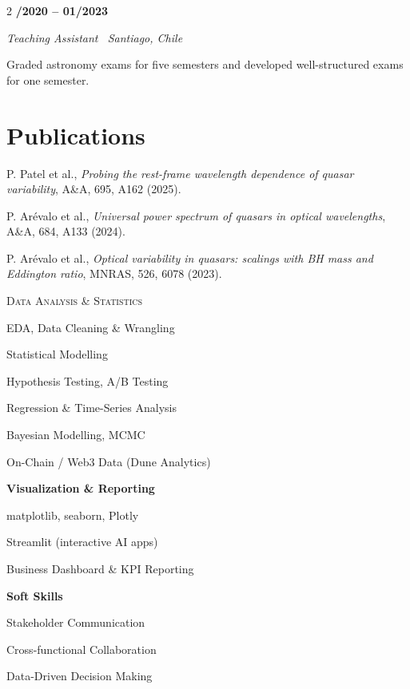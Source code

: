 \documentclass[9pt]{extarticle}
\newcommand{\skillhead}[1]{{\scshape\color{accent}\fontsize{8.4}{10}\selectfont #1}\par\vspace{2pt}}
\newcommand{\skillsub}[1]{{\bfseries\fontsize{8.2}{9.8}\selectfont #1}\par\vspace{2pt}}
\newcommand{\jobtitle}[2]{%
  \noindent{\bfseries\fontsize{9.3}{11}\selectfont #1}\hfill{\bfseries\fontsize{8.6}{10.4}\selectfont #2}\par}
\newcommand{\jobrole}[1]{{\itshape\fontsize{8.6}{10.4}\selectfont #1}\par\vspace{0.5pt}}
\begin{document}
\begin{paracol}{2}
\jobtitle{UNIVERSIDAD DE CHILE}{03/2020 -- 01/2023}
\jobrole{Teaching Assistant \textperiodcentered\ Santiago, Chile}
\begin{bullets}
  \item Graded astronomy exams for five semesters and developed well-structured exams for one semester.
\end{bullets}

\section*{Publications}
P. Patel et al., \textit{Probing the rest-frame wavelength dependence of quasar variability}, A\&A, 695, A162 (2025).\par\vspace{3pt}
P. Ar\'evalo et al., \textit{Universal power spectrum of quasars in optical wavelengths}, A\&A, 684, A133 (2024).\par\vspace{3pt}
P. Ar\'evalo et al., \textit{Optical variability in quasars: scalings with BH mass and Eddington ratio}, MNRAS, 526, 6078 (2023).\par

\switchcolumn

\skillhead{Data Analysis \& Statistics}
\begin{skills}
  \item EDA, Data Cleaning \& Wrangling
  \item Statistical Modelling
  \item Hypothesis Testing, A/B Testing
  \item Regression \& Time-Series Analysis
  \item Bayesian Modelling, MCMC
  \item On-Chain / Web3 Data (Dune Analytics)
\end{skills}

\skillsub{Visualization \& Reporting}
\begin{skills}
  \item matplotlib, seaborn, Plotly
  \item Streamlit (interactive AI apps)
  \item Business Dashboard \& KPI Reporting
\end{skills}

\skillsub{Soft Skills}
\begin{skills}
  \item Stakeholder Communication
  \item Cross-functional Collaboration
  \item Data-Driven Decision Making
\end{skills}


\end{paracol}
\end{document}
